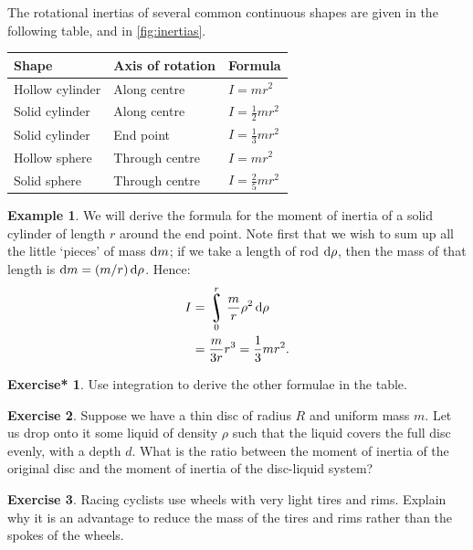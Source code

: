 \documentclass[a4paper]{amsbook}
\theoremstyle{definition}
\newtheorem*{example}{Example}
\newtheorem{exercise}{Exercise}
\numberwithin{exercise}{chapter}
\newtheorem{exercise*}[exercise]{Exercise*}
\numberwithin{exercise}{chapter}
\DeclareMathOperator*{\rint}{\scalerel*{\rotatebox{17}{$\!\int\!$}}{\int}}
\begin{document}
The rotational inertias of several common continuous shapes are given in the following table, and in \cref{fig:inertias}.
\begin{center}
  \def\arraystretch{1.5}
  \begin{tabular}{lll}\hline
    \textbf{Shape} & \textbf{Axis of rotation} & \textbf{Formula}\\\hline
    Hollow cylinder & Along centre & $ I = mr^2 $\\\hline
    Solid cylinder & Along centre & $ I = \frac{1}{2} mr^2 $\\\hline
    Solid cylinder & End point & $ I = \frac{1}{3} mr^2 $\\\hline
    Hollow sphere & Through centre & $ I = mr^2 $\\\hline
    Solid sphere & Through centre & $ I = \frac{2}{5} mr^2 $\\\hline
  \end{tabular}
\end{center}

\begin{example}
  We will derive the formula for the moment of inertia of a solid cylinder of length $ r $ around the end point. Note first
  that we wish to sum up all the little `pieces' of mass $ \dif{m} $; if we take a length of rod $ \dif{\rho} $, then the
  mass of that length is $ \dif{m} = (m/r) \dif{\rho} $. Hence:
  \begin{align*}
    I &= \rint_0^r \frac{m}{r} \rho^2 \dif{\rho}\\
      &= \frac{m}{3r} r^3 = \frac{1}{3} mr^2.
  \end{align*}
\end{example}

\begin{exercise*}
  Use integration to derive the other formulae in the table.
\end{exercise*}

\begin{exercise}
  Suppose we have a thin disc of radius $ R $ and uniform mass $ m $. Let us drop onto it some liquid of density $ \rho $ such that
  the liquid covers the full disc evenly, with a depth $ d $. What is the ratio between the moment of inertia of the original disc
  and the moment of inertia of the disc-liquid system?
\end{exercise}

\begin{exercise}
  Racing cyclists use wheels with very light tires and rims. Explain why it is an advantage to reduce the mass of
  the tires and rims rather than the spokes of the wheels.
\end{exercise}
\end{document}
